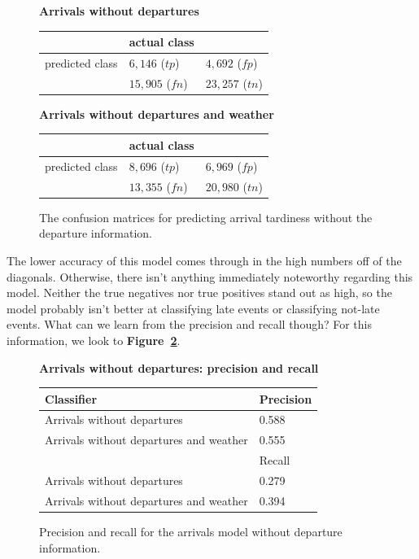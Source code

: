 \documentclass[11pt]{article} %
\begin{document}
\begin{figure}
    \textbf{Arrivals without departures}

    \begin{tabular}[h]{l|ll}
                         & actual class &  \\
         \hline
         predicted class & $6,146$ ($tp$)& $4,692$ ($fp$)\\
                         & $15,905$ ($fn$)& $23,257$ ($tn$)\\
    \end{tabular}

    \textbf{Arrivals without departures and weather}

    \begin{tabular}[h]{l|ll}
                         & actual class &  \\
         \hline
         predicted class & $8,696$ ($tp$)& $6,969$ ($fp$)\\
                         & $13,355$ ($fn$)& $20,980$ ($tn$)\\
    \end{tabular}
    \caption{The confusion matrices for predicting arrival tardiness without
    the departure information.}
    \label{fig:confusion_arrivals_nod}
\end{figure}

The lower accuracy of this model comes through in the high numbers off of the 
diagonals.  Otherwise, there isn't anything immediately noteworthy regarding this
model. Neither the true negatives nor true positives stand out as high, so the
model probably isn't better at classifying late events or classifying not-late
events. What can we learn from the precision and recall though? For this 
information, we look to \textbf{Figure~\ref{fig:pr_arrivals_nod}}.

\begin{figure}
    \textbf{Arrivals without departures: precision and recall}

    \begin{tabular}{l|l}
         Classifier & Precision\\
         \hline
         Arrivals without departures & 0.588\\
         Arrivals without departures and weather & 0.555\\
         \hline
          & Recall\\
         \hline
         Arrivals without departures & 0.279\\
         Arrivals without departures and weather& 0.394\\
    \end{tabular}
    \caption{Precision and recall for the arrivals model without departure 
    information.}
    \label{fig:pr_arrivals_nod}
\end{figure}
\end{document}
